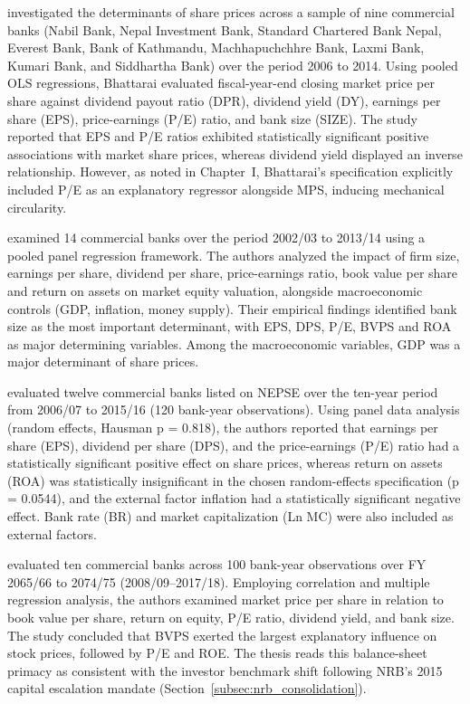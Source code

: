 \citet{bhattarai2014} investigated the determinants of share prices across a sample of nine commercial banks (Nabil Bank, Nepal Investment Bank, Standard Chartered Bank Nepal, Everest Bank, Bank of Kathmandu, Machhapuchchhre Bank, Laxmi Bank, Kumari Bank, and Siddhartha Bank) over the period 2006 to 2014. Using pooled OLS regressions, Bhattarai evaluated fiscal-year-end closing market price per share against dividend payout ratio (DPR), dividend yield (DY), earnings per share (EPS), price-earnings (P/E) ratio, and bank size (SIZE). The study reported that EPS and P/E ratios exhibited statistically significant positive associations with market share prices, whereas dividend yield displayed an inverse relationship. However, as noted in Chapter~I, Bhattarai's specification explicitly included P/E as an explanatory regressor alongside MPS, inducing mechanical circularity.

\citet{pradhan2016} examined 14 commercial banks over the period 2002/03 to 2013/14 using a pooled panel regression framework. The authors analyzed the impact of firm size, earnings per share, dividend per share, price-earnings ratio, book value per share and return on assets on market equity valuation, alongside macroeconomic controls (GDP, inflation, money supply). Their empirical findings identified bank size as the most important determinant, with EPS, DPS, P/E, BVPS and ROA as major determining variables. Among the macroeconomic variables, GDP was a major determinant of share prices.

\citet{bajracharya2019} evaluated twelve commercial banks listed on NEPSE over the ten-year period from 2006/07 to 2015/16 (120 bank-year observations). Using panel data analysis (random effects, Hausman p = 0.818), the authors reported that earnings per share (EPS), dividend per share (DPS), and the price-earnings (P/E) ratio had a statistically significant positive effect on share prices, whereas return on assets (ROA) was statistically insignificant in the chosen random-effects specification (p = 0.0544), and the external factor inflation had a statistically significant negative effect. Bank rate (BR) and market capitalization (Ln MC) were also included as external factors.

\citet{silwal2019} evaluated ten commercial banks across 100 bank-year observations over FY 2065/66 to 2074/75 (2008/09--2017/18). Employing correlation and multiple regression analysis, the authors examined market price per share in relation to book value per share, return on equity, P/E ratio, dividend yield, and bank size. The study concluded that BVPS exerted the largest explanatory influence on stock prices, followed by P/E and ROE. The thesis reads this balance-sheet primacy as consistent with the investor benchmark shift following NRB's 2015 capital escalation mandate (Section~\ref{subsec:nrb_consolidation}).

